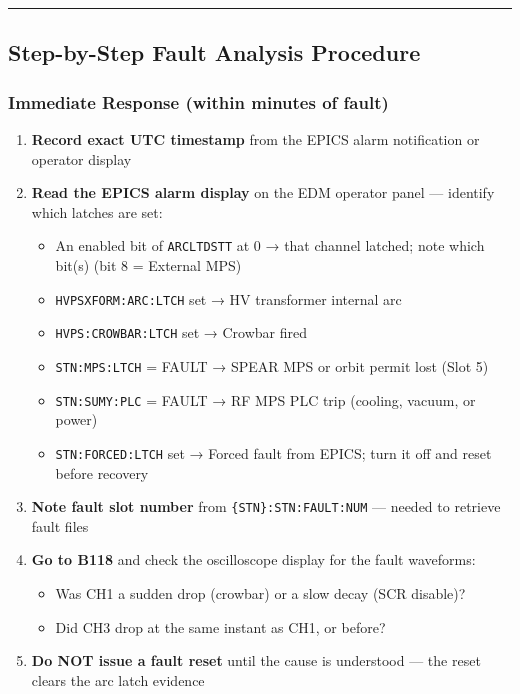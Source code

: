 \begin{center}\rule{0.5\linewidth}{0.5pt}\end{center}

\subsection{Step-by-Step Fault Analysis Procedure}\label{sec:fd-procedure}


\subsubsection{Immediate Response (within minutes of fault)}\label{sec:fd-immediate}


\begin{enumerate}
\def\labelenumi{\arabic{enumi}.}
\tightlist
\item
  \textbf{Record exact UTC timestamp} from the EPICS alarm notification or operator display
\item
  \textbf{Read the EPICS alarm display} on the EDM operator panel --- identify which latches are set:

  \begin{itemize}
  \tightlist
  \item
    An enabled bit of \texttt{ARCLTDSTT} at 0 → that channel latched; note which bit(s) (bit 8 = External MPS)
  \item
    \texttt{HVPSXFORM:\allowbreak{}ARC:\allowbreak{}LTCH} set → HV transformer internal arc
  \item
    \texttt{HVPS:\allowbreak{}CROWBAR:\allowbreak{}LTCH} set → Crowbar fired
  \item
    \texttt{STN:MPS:LTCH} = FAULT → SPEAR MPS or orbit permit lost (Slot 5)
  \item
    \texttt{STN:\allowbreak{}SUMY:\allowbreak{}PLC} = FAULT → RF MPS PLC trip (cooling, vacuum, or power)
  \item
    \texttt{STN:\allowbreak{}FORCED:\allowbreak{}LTCH} set → Forced fault from EPICS; turn it off and reset before recovery
  \end{itemize}
\item
  \textbf{Note fault slot number} from \texttt{\{STN\}:\allowbreak{}STN:\allowbreak{}FAULT:\allowbreak{}NUM} --- needed to retrieve fault files
\item
  \textbf{Go to B118} and check the oscilloscope display for the fault waveforms:

  \begin{itemize}
  \tightlist
  \item
    Was CH1 a sudden drop (crowbar) or a slow decay (SCR disable)?
  \item
    Did CH3 drop at the same instant as CH1, or before?
  \end{itemize}
\item
  \textbf{Do NOT issue a fault reset} until the cause is understood --- the reset clears the arc latch evidence
\end{enumerate}

